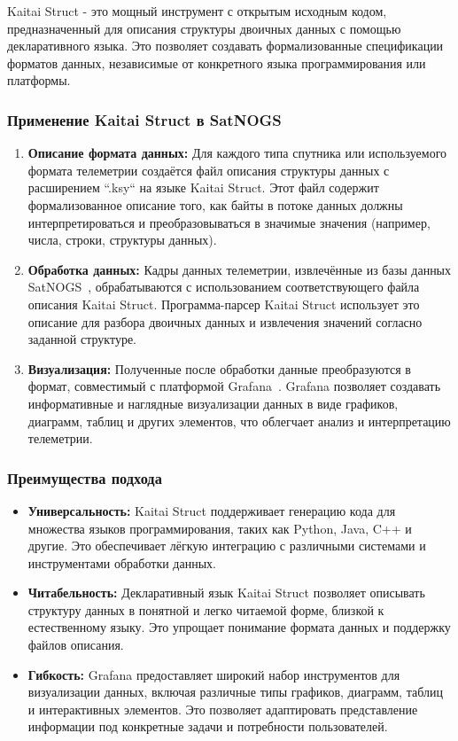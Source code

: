 \documentclass[14pt, a4paper]{extreport}
\begin{document}
    Kaitai Struct - это мощный инструмент с открытым исходным кодом, предназначенный для описания структуры двоичных данных с помощью декларативного языка.
    Это позволяет создавать формализованные спецификации форматов данных,  независимые от конкретного языка программирования или платформы.

    \subsubsection{Применение Kaitai Struct в SatNOGS}

    \begin{enumerate}
        \item \textbf{Описание формата данных:} Для каждого типа спутника или используемого формата телеметрии создаётся файл описания структуры данных с расширением ``.ksy`` на языке Kaitai Struct.
        Этот файл содержит формализованное описание того, как байты в потоке данных должны интерпретироваться и преобразовываться в значимые значения (например, числа, строки, структуры данных).
        \item \textbf{Обработка данных:} Кадры данных телеметрии, извлечённые из базы данных SatNOGS~\cite{satnogs_database_docs}, обрабатываются с использованием соответствующего файла описания Kaitai Struct.
        Программа-парсер Kaitai Struct использует это описание для разбора двоичных данных и извлечения значений согласно заданной структуре.
        \item \textbf{Визуализация:} Полученные после обработки данные преобразуются в формат, совместимый с платформой Grafana~\cite{satnogs_grafana_docs}.
        Grafana позволяет создавать информативные и наглядные визуализации данных в виде графиков, диаграмм, таблиц и других элементов,  что облегчает анализ и интерпретацию телеметрии.
    \end{enumerate}

    \subsubsection{Преимущества подхода}

    \begin{itemize}[label={--}]
        \item \textbf{Универсальность:} Kaitai Struct поддерживает генерацию кода для множества языков программирования, таких как Python, Java, C++ и другие.
        Это обеспечивает лёгкую интеграцию с различными системами и инструментами обработки данных.
        \item \textbf{Читабельность:}  Декларативный язык Kaitai Struct позволяет описывать структуру данных в понятной и легко читаемой форме,  близкой к естественному языку.
        Это упрощает понимание формата данных и поддержку файлов описания.
        \item \textbf{Гибкость:} Grafana предоставляет широкий набор инструментов для визуализации данных, включая различные типы графиков, диаграмм, таблиц и интерактивных элементов.
        Это позволяет адаптировать представление информации под конкретные задачи и потребности пользователей.
    \end{itemize}
\end{document}
